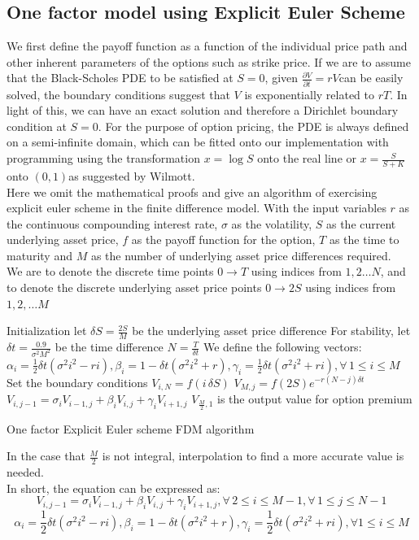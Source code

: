 \subsection{One factor model using Explicit Euler Scheme}
We first define the payoff function as a function of the individual price path and other inherent parameters of the options such as strike price. If we are to assume that the Black-Scholes PDE to be satisfied at $S = 0$, given $\frac{\partial V}{\partial t} = rV$can be easily solved, the boundary conditions suggest that $V$ is exponentially related to $rT$. In light of this, we can have an exact solution and therefore a Dirichlet boundary condition at $S = 0$. For the purpose of option pricing, the PDE is always defined on a semi-infinite domain, which can be fitted onto our implementation with programming using the transformation $x = \log{S}$ onto the real line or $x = \frac{S}{S+K}$ onto $(0, 1)$as suggested by Wilmott.\\[1mm]
Here we omit the mathematical proofs and give an algorithm of exercising explicit euler scheme in the finite difference model. With the input variables $r$ as the continuous compounding interest rate, $\sigma$ as the volatility, $S$ as the current underlying asset price, $f$ as the payoff function for the option, $T$ as the time to maturity and $M$ as the number of underlying asset price differences required.\\
We are to denote the discrete time points $0 \to T$ using indices from $1,2 \dots N$, and to denote the discrete underlying asset price points $0 \to 2S$ using indices from $1,2, \dots M$\\[2mm]
\begin{algorithm}[H]
 Initialization\;
 let $\delta S = \frac{2S}{M}$ be the underlying asset price difference \;
 For stability, let $\delta t = \frac{0.9}{\sigma^{2}M^{2}}$ be the time difference\;
 $N = \frac{T}{\delta t}$\;
 We define the following vectors:\\
 $\alpha_{i} = \frac{1}{2}\delta t(\sigma^{2}i^{2} - ri), \beta_{i} = 1-\delta t(\sigma^{2}i^{2} + r), \gamma_{i} = \frac{1}{2}\delta t(\sigma^{2}i^{2} + ri), \forall \, 1 \le i \le M$\;
 Set the boundary conditions\;
  {
  $V_{i, N} = f(i\,\delta S)$\;
 }
  {
  $V_{M, j} = f(2S)e^{-r(N-j)\delta t}$\;
 }
  {
   {
   $V_{i, j-1} = \sigma_{i}V_{i-1,j} + \beta_{i}V_{i,j} + \gamma_{i}V_{i+1,j} $\;
  }
 }
 $V_{\frac{M}{2},1}$ is the output value for option premium\;
\caption{One factor Explicit Euler scheme FDM algorithm}
\end{algorithm}
In the case that $\frac{M}{2}$ is not integral, interpolation to find a more accurate value is needed.\\[1mm]
In short, the equation can be expressed as:
$$V_{i, j-1} = \sigma_{i}V_{i-1,j} + \beta_{i}V_{i,j} + \gamma_{i}V_{i+1,j},  \forall \,2 \le i \le M-1, \forall \,1 \le j \le N-1$$
$$\alpha_{i} = \frac{1}{2}\delta t(\sigma^{2}i^{2} - ri), \beta_{i} = 1-\delta t(\sigma^{2}i^{2} + r), \gamma_{i} = \frac{1}{2}\delta t(\sigma^{2}i^{2} + ri), \forall 1 \le i \le M$$
\newpage
